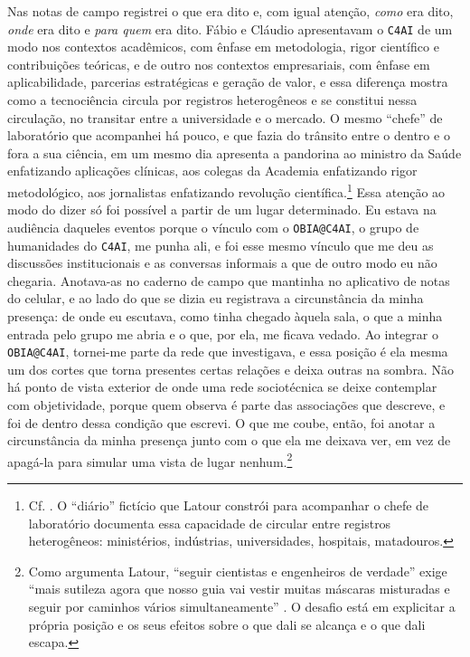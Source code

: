 Nas notas de campo registrei o que era dito e, com igual atenção, \textit{como} era dito, \textit{onde} era dito e \textit{para quem} era dito. Fábio e Cláudio apresentavam o \texttt{C4AI} de um modo nos contextos acadêmicos, com ênfase em metodologia, rigor científico e contribuições teóricas, e de outro nos contextos empresariais, com ênfase em aplicabilidade, parcerias estratégicas e geração de valor, e essa diferença mostra como a tecnociência circula por registros heterogêneos e se constitui nessa circulação, no transitar entre a universidade e o mercado. O mesmo \enquote{chefe} de laboratório que acompanhei há pouco, e que fazia do trânsito entre o dentro e o fora a sua ciência, em um mesmo dia apresenta a pandorina ao ministro da Saúde enfatizando aplicações clínicas, aos colegas da Academia enfatizando rigor metodológico, aos jornalistas enfatizando revolução científica.\footnote{Cf. \textcite[p.~252--255]{Latour2011CienciaEmAcao}. O \enquote{diário} fictício que Latour constrói para acompanhar o chefe de laboratório documenta essa capacidade de circular entre registros heterogêneos: ministérios, indústrias, universidades, hospitais, matadouros.} Essa atenção ao modo do dizer só foi possível a partir de um lugar determinado. Eu estava na audiência daqueles eventos porque o vínculo com o \texttt{OBIA@C4AI}, o grupo de humanidades do \texttt{C4AI}, me punha ali, e foi esse mesmo vínculo que me deu as discussões institucionais e as conversas informais a que de outro modo eu não chegaria. Anotava-as no caderno de campo que mantinha no aplicativo de notas do celular, e ao lado do que se dizia eu registrava a circunstância da minha presença: de onde eu escutava, como tinha chegado àquela sala, o que a minha entrada pelo grupo me abria e o que, por ela, me ficava vedado. Ao integrar o \texttt{OBIA@C4AI}, tornei-me parte da rede que investigava, e essa posição é ela mesma um dos cortes que torna presentes certas relações e deixa outras na sombra. Não há ponto de vista exterior de onde uma rede sociotécnica se deixe contemplar com objetividade, porque quem observa é parte das associações que descreve, e foi de dentro dessa condição que escrevi. O que me coube, então, foi anotar a circunstância da minha presença junto com o que ela me deixava ver, em vez de apagá-la para simular uma vista de lugar nenhum.\footnote{Como argumenta Latour, \enquote{seguir cientistas e engenheiros de verdade} exige \enquote{mais sutileza agora que nosso guia vai vestir muitas máscaras misturadas e seguir por caminhos vários simultaneamente} \parencite[p.~241]{Latour2011CienciaEmAcao}. O desafio está em explicitar a própria posição e os seus efeitos sobre o que dali se alcança e o que dali escapa.}

